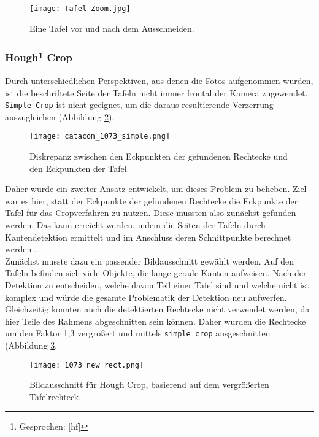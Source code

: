 \begin{figure}[h!]
\centering
\texttt{[image: Tafel Zoom.jpg]}
\caption{Eine Tafel vor und nach dem Ausschneiden.}
\label{fig:tafelcrop}
\end{figure}

\subsubsection{Hough\protect\footnote{Gesprochen: [h\textturnv{}f]} Crop}

Durch unterschiedlichen Perspektiven, aus denen die Fotos aufgenommen wurden, ist die beschriftete Seite der Tafeln nicht immer frontal der Kamera zugewendet. \verb|Simple Crop| ist nicht geeignet, um die daraus resultierende Verzerrung auszugleichen (Abbildung  \ref{fig:parallelogramm}). 

\begin{figure}[h!]
\centering
\texttt{[image: catacom\_1073\_simple.png]}
\caption{Diskrepanz zwischen den Eckpunkten der gefundenen Rechtecke und den Eckpunkten der Tafel.}
\label{fig:parallelogramm}
\end{figure}

Daher wurde ein zweiter Ansatz entwickelt, um dieses Problem zu beheben. Ziel war es hier, statt der Eckpunkte der gefundenen Rechtecke die Eckpunkte der Tafel für das Cropverfahren zu nutzen. Diese mussten also zunächst gefunden werden. Das kann erreicht werden, indem die Seiten der Tafeln durch Kantendetektion ermittelt und im Anschluss deren Schnittpunkte berechnet werden \cite{qixiangye}{} \cite{shaw}.\\
Zunächst musste dazu ein passender Bildausschnitt gewählt werden. Auf den Tafeln befinden sich viele Objekte, die lange gerade Kanten aufweisen. Nach der Detektion zu entscheiden, welche davon Teil einer Tafel sind und welche nicht ist komplex und würde die gesamte Problematik der Detektion neu aufwerfen. Gleichzeitig konnten auch die detektierten Rechtecke nicht verwendet werden, da hier Teile des Rahmens abgeschnitten sein können. Daher wurden die Rechtecke um den Faktor 1,3 vergrößert und mittels \verb|simple crop| ausgeschnitten (Abbildung \ref{fig:tafelrechteck}.

\begin{figure}[h!]
\centering
\texttt{[image: 1073\_new\_rect.png]}
\caption{Bildausschnitt für Hough Crop, basierend auf dem vergrößerten Tafelrechteck.}
\label{fig:tafelrechteck}
\end{figure}

